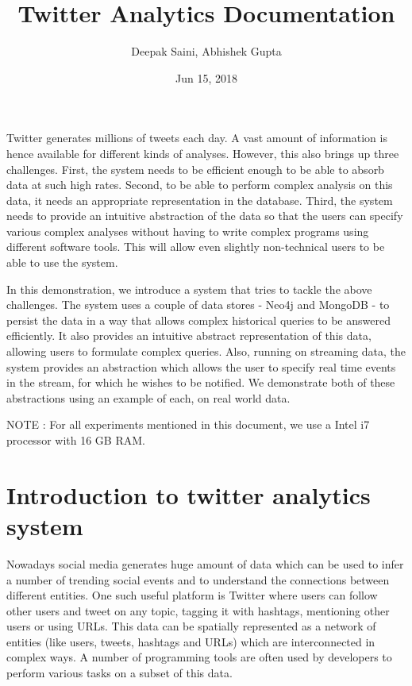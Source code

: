 \documentclass[letterpaper,10pt,english]{sphinxmanual}
\title{Twitter Analytics Documentation}
\date{Jun 15, 2018}
\author{Deepak Saini, Abhishek Gupta}
\begin{document}
\maketitle
\sphinxtableofcontents
{}\label{\detokenize{index::doc}}


Twitter generates millions of tweets each day. A vast amount of information is hence available for different kinds of analyses. However, this also brings up three challenges. First, the system needs to be efficient enough to be able to absorb data at such high rates. Second, to be able to perform complex analysis on this data, it needs an appropriate representation in the database. Third, the system needs to provide an intuitive abstraction of the data so that the users can specify various complex analyses without having to write complex programs using different software tools. This will allow even slightly non-technical users to be able to use the system.

In this demonstration, we introduce a system that tries to tackle the above challenges. The system uses a couple of data stores - Neo4j and MongoDB - to persist the data in a way that allows complex historical queries to be answered efficiently. It also provides an intuitive abstract representation of this data, allowing users to formulate complex queries. Also, running on streaming data, the system provides an abstraction which allows the user to specify real time events in the stream, for which he wishes to be notified. We demonstrate both of these abstractions using an example of each, on real world data.

NOTE : For all experiments mentioned in this document, we use a Intel i7 processor with 16 GB RAM.


\chapter{Introduction to twitter analytics system}
\label{\detokenize{introduction:introduction-to-twitter-analytics-system}}\label{\detokenize{introduction:welcome-to-twitter-analytics-documentation}}\label{\detokenize{introduction::doc}}
Nowadays social media generates huge amount of data which can be used to infer a number of trending social events and to understand the connections between different entities. One such useful platform is Twitter where users can follow other users and tweet on any topic, tagging it with hashtags, mentioning other users or using URLs. This data can be spatially represented as a network of entities (like users, tweets, hashtags and URLs) which are interconnected in complex ways. A number of programming tools are often used by developers to perform various tasks on a subset of this data.
\end{document}

